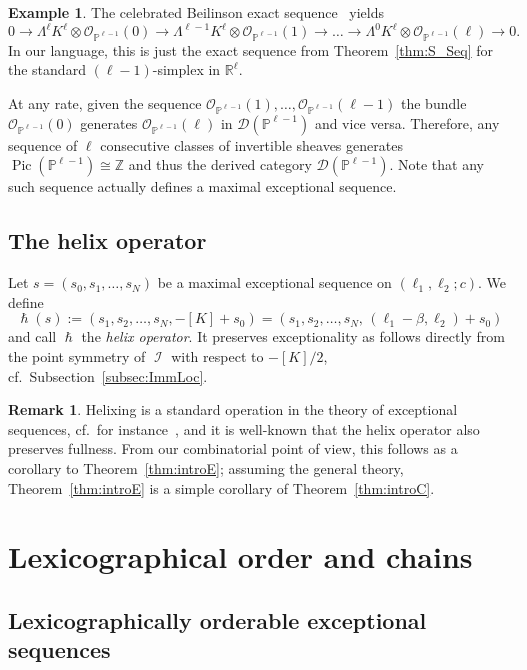 \documentclass[11pt]{article}
\theoremstyle{definition}
\newtheorem{exam}[theo]{Example}
\newtheorem{rema}[theo]{Remark}
\numberwithin{equation}{section}
\newcommand{\PP}{\mathbb P}
\newcommand{\R}{\mathbb R}
\newcommand{\Z}{\mathbb Z}
\newcommand{\CD}{{\mathcal D}}
\newcommand{\CI}{{\mathcal I}}
\newcommand{\CO}{{\mathcal O}}
\newcommand{\Pic}{\operatorname{Pic}}
\newcommand{\kk}{K}
\newcommand{\nImm}{\operatorname{\CI}}
\newcommand{\xb}{\beta}
\newcommand{\cl}{s}
\newcommand{\mes}{maximal exceptional sequence}
\newcommand{\helix}{\hslash}
\newcommand{\ssect}[1]{Subsection~\ref{#1}}
\newcommand{\thHelex}{\ref{thm:introC}}
\newcommand{\thFull}{\ref{thm:introE}}
\begin{document}
\begin{exam}\label{ex:Beilinson}
The celebrated Beilinson exact 
sequence~\cite{beilinson} yields
\begin{equation}\label{eq:BeilSeq}
0 \to \Lambda^\ell\kk^{\ell}\otimes
\CO_{\PP^{\ell-1}}(0)\to
\Lambda^{\ell-1}\kk^{\ell}\otimes
\CO_{\PP^{\ell-1}}(1)\to\ldots\to
\Lambda^{0}\kk^{\ell}\otimes
\CO_{\PP^{\ell-1}}(\ell)\to 0.
\end{equation}
In our language, this is just the 
exact sequence from 
Theorem~\ref{thm:S_Seq} for the 
standard $(\ell-1)$-simplex 
in $\R^{\ell}$. 

At any rate, given the sequence 
$\CO_{\PP^{\ell-1}}(1),\ldots,
\CO_{\PP^{\ell-1}}(\ell-1)$ 
the bundle $\CO_{\PP^{\ell-1}}(0)$ 
generates $\CO_{\PP^{\ell-1}}(\ell)$ 
in $\CD(\PP^{\ell-1})$ and vice versa. 
Therefore, any sequence of $\ell$ consecutive 
classes of invertible sheaves generates 
$\Pic(\PP^{\ell-1})\cong\Z$ and thus 
the derived category $\CD(\PP^{\ell-1})$. 
Note that any such sequence actually 
defines a maximal exceptional 
sequence.
\end{exam}

\subsection{The helix operator}
\label{subsec:helixOp}
Let $\cl=(\cl_0,\cl_1,\ldots,\cl_N)$ be a 
{\mes} on $(\ell_1,\ell_2;c)$. We define
$$  
\helix(\cl):=(\cl_1,\cl_2,\ldots,\cl_N,
-[K]+\cl_0)=(\cl_1,\cl_2,\ldots,\cl_N,\,
(\ell_1-\xb,\ell_2)+\cl_0)
$$  
and call $\helix$ the {\em helix operator}. 
It preserves exceptionality as follows 
directly from the point symmetry of $\nImm$ 
with respect to $-[K]/2$, cf.\ 
\ssect{subsec:ImmLoc}. 

\begin{rema}
\label{rem:HelixOperator}
{Helixing is a standard operation in 
the theory of exceptional sequences, cf.\ for 
instance~\cite{rudakov}, and it is well-known 
that the helix operator also preserves fullness. 
From our combinatorial point of view, this follows 
as a corollary to Theorem~{\thFull}; assuming the 
general theory, Theorem~{\thFull} is a simple 
corollary of Theorem~{\thHelex}.}
\end{rema}

\section{Lexicographical order and chains}
\label{sec:Relax}
\subsection{Lexicographically orderable exceptional sequences}
\label{subsec:CriteriaRelax}
\end{document}
